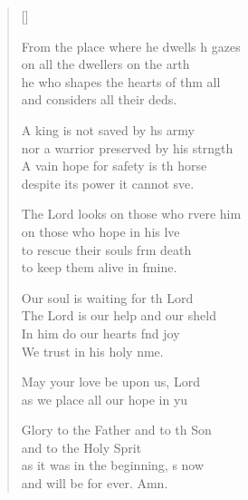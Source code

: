 \begin{verse}[\versewidth]
\begin{patverse}
From the place where he dwells h gazes\\
    on all the dwellers on the arth\\
he who shapes the hearts of thm all\\
    and considers all their deds.

A king is not saved by h\pointup{\i}s army\\
    nor a warrior preserved by his strngth\\
A vain hope for safety is th horse\\
    despite its power it cannot sve.

The Lord looks on those who rvere him\\
    on those who hope in his lve\\
to rescue their souls frm death\\
    to keep them alive in fmine.

Our soul is waiting for th Lord\\
    The Lord is our help and our sh\pointup{\i}eld\\
In him do our hearts f\pointup{\i}nd joy\\
    We trust in his holy nme.

May your love be upon us,  Lord\\
    as we place all our hope in yu

Glory to the Father and to th Son\\
    and to the Holy Sp\pointup{\i}rit\\
as it was in the beginning, \pointup{\i}s now\\
    and will be for ever. Amn.
  \end{patverse}
\end{verse}
